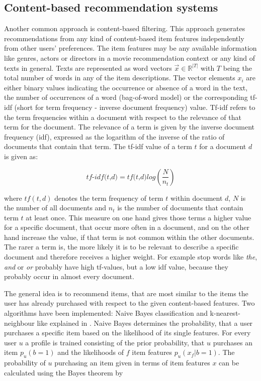 \documentclass[10pt]{reportMaster}
\begin{document}


\subsection{Content-based recommendation systems}
\label{rs_cb}

Another common approach is content-based filtering.
This approach generates recommendations from any kind of content-based item features independently from other users' preferences.
The item features may be any available information like genres, actors or directors in a movie recommendation context or any kind of texts in general.
Texts are represented as word vectors $\vec{x} \in \mathds{R}^{|T|}$ with $T$ being the total number of words in any of the item descriptions.
The vector elements $x_i$ are either binary values indicating the occurrence or absence of a word in the text, the number of occurrences of a word (bag-of-word model) or the corresponding tf-idf (short for term frequency - inverse document frequency) value.
Tf-idf refers to the term frequencies within a document with respect to the relevance of that term for the document.
The relevance of a term is given by the inverse document frequency (idf), expressed as the logarithm of the inverse of the ratio of documents that contain that term.
The tf-idf value of a term $t$ for a document $d$ is given as:

\begin{equation}
	\textit{tf-idf(t,d)} = \textit{tf(t,d)} log(\frac{N}{n_t})
\end{equation}

where $tf(t,d)$ denotes the term frequency of term $t$ within document $d$, $N$ is the number of all documents and $n_t$ is the number of documents that contain term $t$ at least once. 
This measure on one hand gives those terms a higher value for a specific document, that occur more often in a document, and on the other hand increase the value, if that term is not common within the other documents.
The rarer a term is, the more likely it is to be relevant to describe a specific document and therefore receives a higher weight.
For example stop words like \textit{the}, \textit{and} or \textit{or} probably have high tf-values, but a low idf value, because they probably occur in almost every document.

The general idea is to recommend items, that are most similar to the items the user has already purchased with respect to the given content-based features.
Two algorithms have been implemented: Naive Bayes classification and k-nearest-neighbour like explained in \cite{contentbasedPazzani}.
Naive Bayes determines the probability, that a user purchases a specific item based on the likelihood of its single features.
For every user $u$ a profile is trained consisting of the prior probability, that $u$ purchases an item $p_u(b=1)$ and  the likelihoods of $f$ item features $p_u(x_f|b=1)$.
The probability of $u$ purchasing an item given in terms of item features $x$ can be calculated using the Bayes theorem by 
\end{document}
